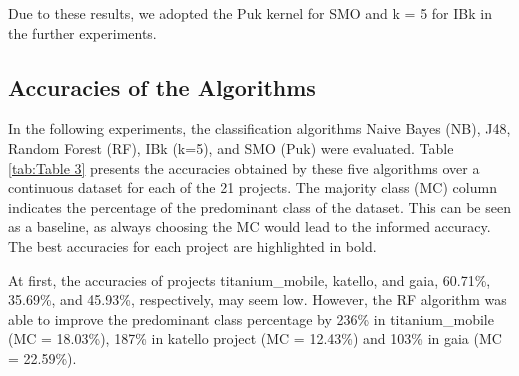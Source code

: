 \documentclass{sig-alternate}
\begin{document}
Due to these results, we adopted the Puk kernel for SMO and k = 5 for IBk in the further experiments.

\subsection{Accuracies of the Algorithms}
In the following experiments, the classification algorithms Naive Bayes (NB), J48, Random Forest (RF), IBk (k=5), and SMO (Puk) were evaluated. Table \ref{tab:Table 3} presents the accuracies obtained by these five algorithms over a continuous dataset for each of the 21 projects. The majority class (MC) column indicates the percentage of the predominant class of the dataset. This can be seen as a baseline, as always choosing the MC would lead to the informed accuracy. The best accuracies for each project are highlighted in bold. 

At first, the accuracies of projects titanium\_mobile, katello, and gaia, 60.71\%, 35.69\%, and 45.93\%, respectively, may seem low. However, the RF algorithm was able to improve the predominant class percentage by 236\% in titanium\_mobile (MC = 18.03\%), 187\% in katello project (MC = 12.43\%) and 103\% in gaia (MC = 22.59\%).
\end{document}
